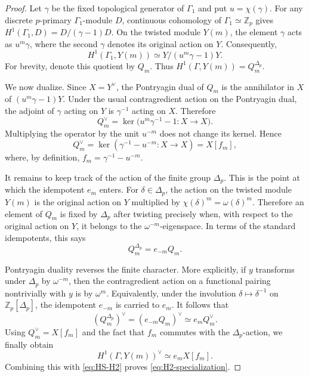 \documentclass[10pt,a4paper]{amsart}
\newcommand{\Zp}{\mathbb Z_p}
\begin{document}
\begin{proof}
Let $\gamma$ be the fixed topological generator of $\Gamma_1$ and
put $u=\chi(\gamma)$. For any discrete $p$-primary
$\Gamma_1$-module $D$, continuous cohomology of
$\Gamma_1\simeq\Zp$ gives
$H^1(\Gamma_1,D)=D/(\gamma-1)D$. On the twisted module $Y(m)$,
the element $\gamma$ acts as $u^m\gamma$, where the second
$\gamma$ denotes its original action on $Y$. Consequently,
\[
 H^1(\Gamma_1,Y(m))
 \simeq Y/(u^m\gamma-1)Y.
\]
For brevity, denote this quotient by $Q_m$. Thus
$H^1(\Gamma,Y(m))=Q_m^{\Delta_p}$.

We now dualize. Since $X=Y^\vee$, the Pontryagin dual of $Q_m$ is
the annihilator in $X$ of $(u^m\gamma-1)Y$. Under the usual
contragredient action on the Pontryagin dual, the adjoint of
$\gamma$ acting on $Y$ is $\gamma^{-1}$ acting on $X$. Therefore
\[
 Q_m^\vee
 =
 \ker\bigl(u^m\gamma^{-1}-1:X\longrightarrow X\bigr).
\]
Multiplying the operator by the unit $u^{-m}$ does not change its
kernel. Hence
\[
 Q_m^\vee
 =
 \ker(\gamma^{-1}-u^{-m}:X\longrightarrow X)
 =
 X[f_m],
\]
where, by definition, $f_m=\gamma^{-1}-u^{-m}$.

It remains to keep track of the action of the finite group
$\Delta_p$. This is the point at which the idempotent $e_m$ enters.
For $\delta\in\Delta_p$, the action on the twisted module $Y(m)$ is
the original action on $Y$ multiplied by
$\chi(\delta)^m=\omega(\delta)^m$. Therefore an element of $Q_m$
is fixed by $\Delta_p$ after twisting precisely when, with respect
to the original action on $Y$, it belongs to the
$\omega^{-m}$-eigenspace. In terms of the standard idempotents,
this says
\[
 Q_m^{\Delta_p}=e_{-m}Q_m.
\]

Pontryagin duality reverses the finite character. More explicitly,
if $y$ transforms under $\Delta_p$ by $\omega^{-m}$, then the
contragredient action on a functional pairing nontrivially with
$y$ is by $\omega^m$. Equivalently, under the involution
$\delta\mapsto\delta^{-1}$ on $\Zp[\Delta_p]$, the idempotent
$e_{-m}$ is carried to $e_m$. It follows that
\[
 (Q_m^{\Delta_p})^\vee
 =
 (e_{-m}Q_m)^\vee
 \simeq e_mQ_m^\vee.
\]
Using $Q_m^\vee=X[f_m]$ and the fact that $f_m$ commutes with the
$\Delta_p$-action, we finally obtain
\[
 H^1(\Gamma,Y(m))^\vee
 \simeq e_mX[f_m].
\]
Combining this with \eqref{eq:HS-H2} proves
\eqref{eq:H2-specialization}.
\end{proof}
\end{document}
